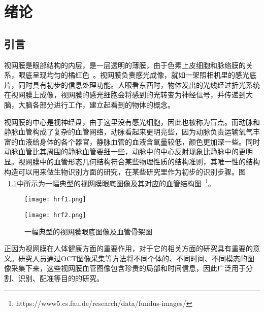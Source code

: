 

\chapter{绪论}
\label{cha1}

\section{引言}

 视网膜是眼部结构的内层，是一层透明的薄膜，由于色素上皮细胞和脉络膜的关系，眼底呈现均匀的橘红色~\cite{retinal}。视网膜负责感光成像，就如一架照相机里的感光底片，同时具有初步的信息处理功能。人眼看东西时，物体发出的光线经过折光系统在视网膜上成像，视网膜的感光细胞会将感到的光转变为神经信号，并传递到大脑，大脑各部分进行工作，建立起看到的物体的概念。
 
视网膜的中心是视神经盘，由于这里没有感光细胞，因此也被称为盲点。而动脉和静脉血管构成了复杂的血管网络，动脉看起来更明亮些，因为动脉负责运输氧气丰富的血液给身体的各个器官，静脉血管的血液含氧量较低，颜色更加深一些。同时动脉血管比其周围的静脉血管要细一些，动脉中的中心反射现象比静脉中的更明显。视网膜中的血管形态几何结构符合某些物理性质的结构准则，其唯一性的结构构造可以用来做生物识别方面的研究，在某些研究里作为初步的识别步骤。图 ~\ref{hrf1}中所示为一幅典型的视网膜眼底图像及其对应的血管结构图~\footnote{https://www5.cs.fau.de/research/data/fundus-images/}。
 \begin{figure}[ht!]
    \centering
 \begin{minipage}{0.45\linewidth}
  \texttt{[image: hrf1.png]}
\end{minipage}
\begin{minipage}{0.45\linewidth}
  \texttt{[image: hrf2.png]}
\end{minipage}
\caption{一幅典型的视网膜眼底图像及血管骨架图}
  \label{hrf1}
 \end{figure}
 
正因为视网膜在人体健康方面的重要作用，对于它的相关方面的研究具有重要的意义。研究人员通过OCT图像采集等方法将不同个体的、不同时间、不同模态的图像采集下来，这些视网膜血管图像包含珍贵的局部和时间信息，因此广泛用于分割、识别、配准等目的的研究。
  
